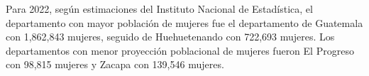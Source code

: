 Para 2022, según estimaciones del Instituto Nacional de Estadística, el departamento con mayor población de mujeres fue el departamento de Guatemala con 1,862,843 mujeres, seguido de Huehuetenando con 722,693 mujeres. Los departamentos con menor proyección poblacional de mujeres fueron El Progreso con 98,815 mujeres y Zacapa con 139,546 mujeres. 
